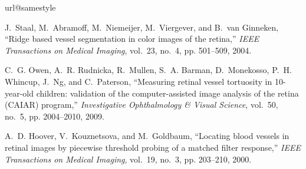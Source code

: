 \documentclass[10pt,twocolumn,letterpaper]{article}
\begin{document}
{\small
\begin{thebibliography}{1}
		\providecommand{\url}[1]{#1}
		\csname url@samestyle\endcsname
		\providecommand{\newblock}{\relax}
		\providecommand{\bibinfo}[2]{#2}
		\providecommand{\BIBentrySTDinterwordspacing}{\spaceskip=0pt\relax}
		\providecommand{\BIBentryALTinterwordstretchfactor}{4}
		\providecommand{\BIBentryALTinterwordspacing}{\spaceskip=\fontdimen2\font plus
			\BIBentryALTinterwordstretchfactor\fontdimen3\font minus
			\fontdimen4\font\relax}
		\providecommand{\BIBforeignlanguage}[2]{{\expandafter\ifx\csname l@#1\endcsname\relax
				\typeout{** WARNING: IEEEtran.bst: No hyphenation pattern has been}\typeout{** loaded for the language `#1'. Using the pattern for}\typeout{** the default language instead.}\else
				\language=\csname l@#1\endcsname
				\fi
				#2}}
		\providecommand{\BIBdecl}{\relax}
		\BIBdecl
		
		J.~Staal, M.~Abramoff, M.~Niemeijer, M.~Viergever, and B.~van Ginneken,
		``{Ridge based vessel segmentation in color images of the retina},''
		\emph{{IEEE Transactions on Medical Imaging}}, vol.~23, no.~4, pp. 501--509,
		2004.
		
		C.~G. Owen, A.~R. Rudnicka, R.~Mullen, S.~A. Barman, D.~Monekosso, P.~H.
		Whincup, J.~Ng, and C.~Paterson, ``Measuring retinal vessel tortuosity in
		10-year-old children: validation of the computer-assisted image analysis of
		the retina ({CAIAR}) program,'' \emph{Investigative Ophthalmology \& Visual
			Science}, vol.~50, no.~5, pp. 2004--2010, 2009.
		
		A.~D. {Hoover}, V.~{Kouznetsova}, and M.~{Goldbaum}, ``Locating blood vessels
		in retinal images by piecewise threshold probing of a matched filter
		response,'' \emph{IEEE Transactions on Medical Imaging}, vol.~19, no.~3, pp.
		203--210, 2000.
		
	\end{thebibliography}
	
}
\end{document}
